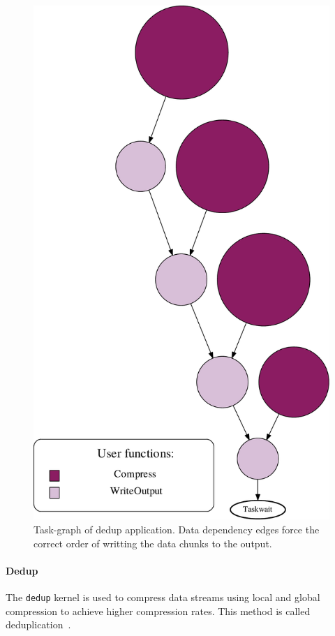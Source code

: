 {\begin{figure}[t!]%
	\center
	\includegraphics[width=.4\columnwidth]{task_benchmarks/figures/dedup_taskgraph}%
	\caption{Task-graph of dedup application.  Data dependency edges force the correct order
of writting the data chunks to the output.}
	\label{fig:dedup_tg}%
	\vspace{.5cm}
\end{figure}


\paragraph{\textbf{Dedup}}
The \texttt{dedup} kernel is used to compress data streams using local and global
compression to achieve higher compression rates.  This method is called
deduplication~\cite{Quinlan:2002:ABP:1083323.1083333}.

}
